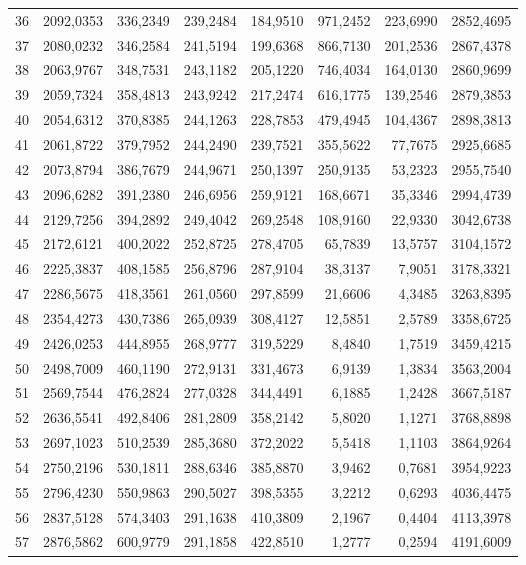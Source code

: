 \begin{small}
\begin{longtable}{rrrrrrrr}
36 & 2092,0353 & 336,2349 & 239,2484 & 184,9510 & 971,2452 & 223,6990 & 2852,4695 \\
37 & 2080,0232 & 346,2584 & 241,5194 & 199,6368 & 866,7130 & 201,2536 & 2867,4378 \\
38 & 2063,9767 & 348,7531 & 243,1182 & 205,1220 & 746,4034 & 164,0130 & 2860,9699 \\
39 & 2059,7324 & 358,4813 & 243,9242 & 217,2474 & 616,1775 & 139,2546 & 2879,3853 \\
40 & 2054,6312 & 370,8385 & 244,1263 & 228,7853 & 479,4945 & 104,4367 & 2898,3813 \\
41 & 2061,8722 & 379,7952 & 244,2490 & 239,7521 & 355,5622 & 77,7675 & 2925,6685 \\
42 & 2073,8794 & 386,7679 & 244,9671 & 250,1397 & 250,9135 & 53,2323 & 2955,7540 \\
43 & 2096,6282 & 391,2380 & 246,6956 & 259,9121 & 168,6671 & 35,3346 & 2994,4739 \\
44 & 2129,7256 & 394,2892 & 249,4042 & 269,2548 & 108,9160 & 22,9330 & 3042,6738 \\
45 & 2172,6121 & 400,2022 & 252,8725 & 278,4705 & 65,7839 & 13,5757 & 3104,1572 \\
46 & 2225,3837 & 408,1585 & 256,8796 & 287,9104 & 38,3137 & 7,9051 & 3178,3321 \\
47 & 2286,5675 & 418,3561 & 261,0560 & 297,8599 & 21,6606 & 4,3485 & 3263,8395 \\
48 & 2354,4273 & 430,7386 & 265,0939 & 308,4127 & 12,5851 & 2,5789 & 3358,6725 \\
49 & 2426,0253 & 444,8955 & 268,9777 & 319,5229 & 8,4840 & 1,7519 & 3459,4215 \\
50 & 2498,7009 & 460,1190 & 272,9131 & 331,4673 & 6,9139 & 1,3834 & 3563,2004 \\
51 & 2569,7544 & 476,2824 & 277,0328 & 344,4491 & 6,1885 & 1,2428 & 3667,5187 \\
52 & 2636,5541 & 492,8406 & 281,2809 & 358,2142 & 5,8020 & 1,1271 & 3768,8898 \\
53 & 2697,1023 & 510,2539 & 285,3680 & 372,2022 & 5,5418 & 1,1103 & 3864,9264 \\
54 & 2750,2196 & 530,1811 & 288,6346 & 385,8870 & 3,9462 & 0,7681 & 3954,9223 \\
55 & 2796,4230 & 550,9863 & 290,5027 & 398,5355 & 3,2212 & 0,6293 & 4036,4475 \\
56 & 2837,5128 & 574,3403 & 291,1638 & 410,3809 & 2,1967 & 0,4404 & 4113,3978 \\
57 & 2876,5862 & 600,9779 & 291,1858 & 422,8510 & 1,2777 & 0,2594 & 4191,6009 \\

\end{longtable}
\end{small}
